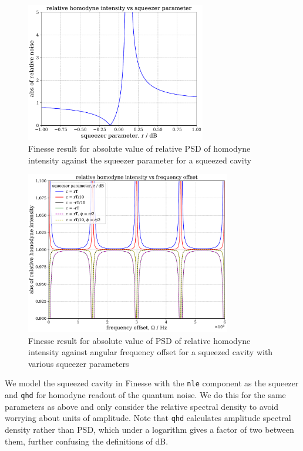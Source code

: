 \documentclass[aps,pra,superscriptaddress,reprint,nofootinbib]{revtex4-1}
\newcommand{\code}[1]{\texttt{#1}}
\begin{document}
\begin{figure}
	\begin{center}
	\includegraphics[width=0.7\textwidth]{figures/pykat_relative_qhd_vs_r.pdf}
	\end{center}
	\caption{Finesse result for absolute value of relative PSD of homodyne intensity against the squeezer parameter for a squeezed cavity}
	\label{fig:pykat_relative_qhd_vs_r}
\end{figure}

\begin{figure}
	\begin{center}
	\includegraphics[width=0.8\textwidth]{figures/pykat_relative_qhd_vs_freq.pdf}
	\end{center}
	\caption{Finesse result for absolute value of PSD of relative homodyne intensity against angular frequency offset for a squeezed cavity with various squeezer parameters}
	\label{fig:pykat_relative_qhd_vs_freq}
\end{figure}

We model the squeezed cavity in Finesse with the \code{nle} component as the squeezer and \code{qhd} for homodyne readout of the quantum noise. We do this for the same parameters as above and only consider the relative spectral density to avoid worrying about units of amplitude. Note that \code{qhd} calculates amplitude spectral density rather than PSD, which under a logarithm gives a factor of two between them, further confusing the definitions of dB.
\end{document}
